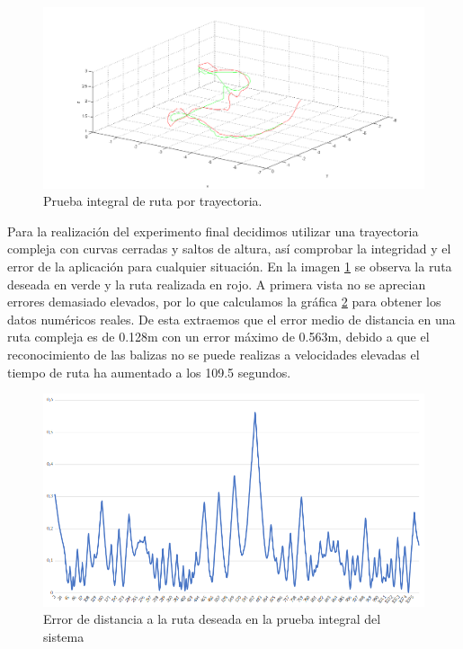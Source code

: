 \begin{figure}[H]
	\begin{center}
		\includegraphics[width=1\textwidth]{imag/IMG43.png}
				\caption{Prueba integral de ruta por trayectoria.}
		\label{fig:Prueba integral de ruta por trayectoria.}	
	\end{center}
\end{figure}

\hspace{1cm} Para la realización del experimento final decidimos utilizar una trayectoria compleja con curvas cerradas y saltos de altura, así comprobar la integridad y el error de la aplicación para cualquier situación. En la imagen \ref{fig:Prueba integral de ruta por trayectoria.} se observa la ruta deseada en verde y la ruta realizada en rojo. A primera vista no se aprecian errores demasiado elevados, por lo que calculamos la gráfica \ref{fig:Error de distancia final.} para obtener los datos numéricos reales. De esta extraemos que el error medio de distancia en una ruta compleja es de  0.128m con un error máximo de 0.563m, debido a que el reconocimiento de las balizas no se puede realizas a velocidades elevadas el tiempo de ruta ha aumentado a los 109.5 segundos.

\begin{figure}[H]
	\begin{center}
		\includegraphics[width=1\textwidth]{imag/IMG44.png}
				\caption{Error de distancia a la ruta deseada en la prueba integral del sistema}
		\label{fig:Error de distancia final.}	
	\end{center}
\end{figure}

